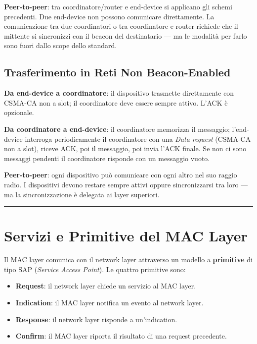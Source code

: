\documentclass[
  italian,
  openany]{book}
\providecommand{\tightlist}{%
  \setlength{\itemsep}{0pt}\setlength{\parskip}{0pt}}
\begin{document}
\textbf{Peer-to-peer}: tra coordinatore/router e end-device si applicano
gli schemi precedenti. Due end-device non possono comunicare
direttamente. La comunicazione tra due coordinatori o tra coordinatore e
router richiede che il mittente si sincronizzi con il beacon del
destinatario --- ma le modalità per farlo sono fuori dallo scope dello
standard.

\subsection{Trasferimento in Reti Non
Beacon-Enabled}\label{trasferimento-in-reti-non-beacon-enabled}

\textbf{Da end-device a coordinatore}: il dispositivo trasmette
direttamente con CSMA-CA non a slot; il coordinatore deve essere sempre
attivo. L'ACK è opzionale.

\textbf{Da coordinatore a end-device}: il coordinatore memorizza il
messaggio; l'end-device interroga periodicamente il coordinatore con una
\emph{Data request} (CSMA-CA non a slot), riceve ACK, poi il messaggio,
poi invia l'ACK finale. Se non ci sono messaggi pendenti il coordinatore
risponde con un messaggio vuoto.

\textbf{Peer-to-peer}: ogni dispositivo può comunicare con ogni altro
nel suo raggio radio. I dispositivi devono restare sempre attivi oppure
sincronizzarsi tra loro --- ma la sincronizzazione è delegata ai layer
superiori.

\begin{center}\rule{0.5\linewidth}{0.5pt}\end{center}

\section{Servizi e Primitive del MAC
Layer}\label{servizi-e-primitive-del-mac-layer}

Il MAC layer comunica con il network layer attraverso un modello a
\textbf{primitive} di tipo SAP (\emph{Service Access Point}). Le quattro
primitive sono:

\begin{itemize}
\tightlist
\item
  \textbf{Request}: il network layer chiede un servizio al MAC layer.
\item
  \textbf{Indication}: il MAC layer notifica un evento al network layer.
\item
  \textbf{Response}: il network layer risponde a un'indication.
\item
  \textbf{Confirm}: il MAC layer riporta il risultato di una request
  precedente.
\end{itemize}
\end{document}
